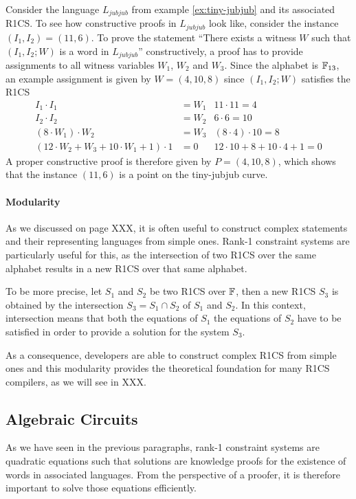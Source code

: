 \begin{example}\label{ex:tiny-jubjub-r1cs} Consider the language $L_{jubjub}$ from example \ref{ex:tiny-jubjub} and its associated R1CS. To see how constructive proofs in $L_{jubjub}$ look like, consider the instance $(I_1,I_2)= (11,6)$. To prove the statement ``There exists a witness $W$ such that $(I_1,I_2;W)$ is a word in $L_{jubjub}$'' constructively, a proof has to provide assignments to all witness variables $W_1$, $W_2$ and $W_3$. Since the alphabet is $\mathbb{F}_{13}$, an example assignment is given by
$W=(4,10,8)$ since $(I_1,I_2;W)$ satisfies the R1CS
\begin{align*}
I_1 \cdot I_1 & = W_1 & 11\cdot 11 = 4\\
I_2 \cdot I_2 & = W_2 & 6 \cdot 6 = 10 \\
(8 \cdot W_1) \cdot W_2 & = W_3 & (8\cdot 4)\cdot 10 = 8\\
(12\cdot W_2 + W_3 + 10\cdot W_1 + 1)\cdot 1 & = 0 & 12\cdot 10 + 8 + 10\cdot 4 + 1 = 0
\end{align*}
A proper constructive proof is therefore given by $P=(4,10,8)$, which shows that the instance $(11,6)$ is a point on the tiny-jubjub curve. 
\end{example}
\paragraph{Modularity} As we discussed on page \pageref{modularity} XXX, it is often useful to construct complex statements and their representing languages from simple ones. Rank-1 constraint systems are particularly useful for this, as the intersection of two R1CS over the same alphabet results in a new R1CS over that same alphabet. 

To be more precise, let $S_1$ and $S_2$ be two R1CS over $\mathbb{F}$, then a new R1CS $S_3$ is obtained by the intersection $S_3 = S_1\cap S_2$  of $S_1$ and $S_2$. In this context, intersection means that both the equations of $S_1$  the equations of $S_2$ have to be satisfied in order to provide a solution for the system $S_3$.

As a consequence, developers are able to construct complex R1CS from simple ones and this modularity provides the theoretical foundation for many R1CS compilers, as we will see in XXX.

\subsection{Algebraic Circuits} As we have seen in the previous paragraphs, rank-1 constraint systems are quadratic equations such that solutions are knowledge proofs for the existence of words in associated languages. From the perspective of a proofer, it is therefore important to solve those equations efficiently. 

